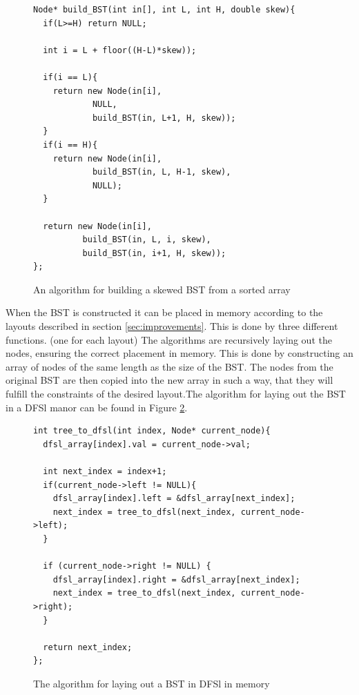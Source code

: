 \documentclass{article}
\begin{document}
\begin{figure}[H]
	\centering
	\begin{lstlisting}
Node* build_BST(int in[], int L, int H, double skew){
  if(L>=H) return NULL;

  int i = L + floor((H-L)*skew));

  if(i == L){
    return new Node(in[i],
		    NULL,
		    build_BST(in, L+1, H, skew));
  }
  if(i == H){
    return new Node(in[i],
		    build_BST(in, L, H-1, skew),
		    NULL);
  }
  
  return new Node(in[i],
		  build_BST(in, L, i, skew),
		  build_BST(in, i+1, H, skew));
};
	\end{lstlisting}
	\caption{An algorithm for building a skewed BST from a sorted array}
	\label{code:build_bst}
\end{figure}

When the BST is constructed it can be placed in memory according to the layouts described in section \ref{sec:improvements}. This is done by three different functions. (one for each layout) The algorithms are recursively laying out the nodes, ensuring the correct placement in memory. This is done by constructing an array of nodes of the same length as the size of the BST. The nodes from the original BST are then copied into the new array in such a way, that they will fulfill the constraints of the desired layout.The algorithm for laying out the BST in a DFSl manor can be found in Figure \ref{code:dfsl_layout}.

\begin{figure}[H]
	\centering
	\begin{lstlisting}
int tree_to_dfsl(int index, Node* current_node){
  dfsl_array[index].val = current_node->val;

  int next_index = index+1;
  if(current_node->left != NULL){
    dfsl_array[index].left = &dfsl_array[next_index];
    next_index = tree_to_dfsl(next_index, current_node->left);
  }
  
  if (current_node->right != NULL) {
    dfsl_array[index].right = &dfsl_array[next_index];
    next_index = tree_to_dfsl(next_index, current_node->right);
  }

  return next_index;
};
	\end{lstlisting}
	\caption{The algorithm for laying out a BST in DFSl in memory}
	\label{code:dfsl_layout}
\end{figure}
\end{document}

